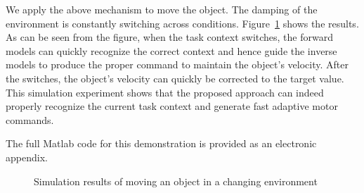 We apply the above mechanism to move the object. The damping of the environment is constantly switching across conditions.
Figure~\ref{fig:result_sim} shows the results. As can be seen from the
figure, when the task context switches, the forward models can quickly
recognize the correct context and hence guide the inverse models to
produce the proper command to maintain the object's velocity. After
the switches, the object's velocity can quickly be corrected to the
target value. This simulation experiment shows that the proposed
approach can indeed properly recognize the current task context and
generate fast adaptive motor commands.

The full Matlab code for this demonstration is provided as an
electronic appendix.

\begin{figure}
  \centering

  \vspace{0.3cm}

  \vspace{0.3cm}
%

  \caption{ \scriptsize{Simulation results of moving an object in a changing environment}
}
\label{fig:result_sim}
\end{figure} 